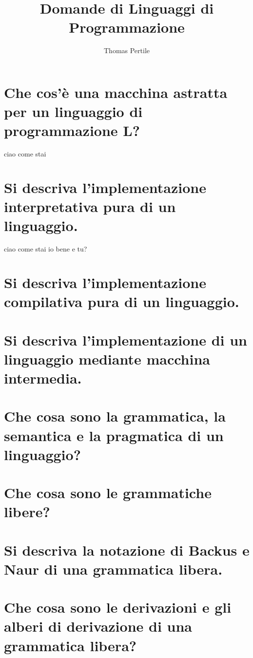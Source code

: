 \documentclass[a4paper, 10pt, italian]{article} %
\author{Thomas Pertile} %
\title{Domande di Linguaggi di Programmazione} %
\begin{document}
\maketitle %

\section{Che cos’\`{e} una macchina astratta per un linguaggio di programmazione L?} %
ciao 
come 
stai

\section{Si descriva l’implementazione interpretativa pura di un linguaggio.}
ciao come stai io bene e tu?

\section{Si descriva l’implementazione compilativa pura di un linguaggio.}

\section{Si descriva l’implementazione di un linguaggio mediante macchina intermedia.}

\section{Che cosa sono la grammatica, la semantica e la pragmatica di un linguaggio?}

\section{Che cosa sono le grammatiche libere?}

\section{Si descriva la notazione di Backus e Naur di una grammatica libera.}

\section{Che cosa sono le derivazioni e gli alberi di derivazione di una grammatica libera?}
\end{document}

